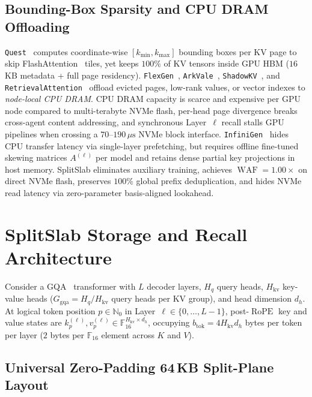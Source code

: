 \documentclass[final,5p,times,twocolumn]{elsarticle}
\theoremstyle{definition}
\theoremstyle{remark}
\newcommand{\SplitSlab}{\textup{\textsc{SplitSlab}}}
\newcommand{\RoPE}{\operatorname{RoPE}}
\newcommand{\WAF}{\operatorname{WAF}}
\def\SplitSlab{SplitSlab}%
\begin{document}
\subsection{Bounding-Box Sparsity and CPU DRAM Offloading}
\texttt{Quest}~\cite{tang2024quest} computes coordinate-wise $[k_{\min}, k_{\max}]$ bounding boxes per KV page to skip FlashAttention~\cite{dao2022flashattention} tiles, yet keeps $100\%$ of KV tensors inside GPU HBM ($16$\,KB metadata + full page residency). \texttt{FlexGen}~\cite{sheng2023flexgen}, \texttt{ArkVale}~\cite{chen2024arkvale}, \texttt{ShadowKV}~\cite{sun2025shadowkv}, and \texttt{RetrievalAttention}~\cite{liu2024retrievalattention} offload evicted pages, low-rank values, or vector indexes to \emph{node-local CPU DRAM}. CPU DRAM capacity is scarce and expensive per GPU node compared to multi-terabyte NVMe flash, per-head page divergence breaks cross-agent content addressing, and synchronous Layer~$\ell$ recall stalls GPU pipelines when crossing a $70$--$190\,\mu\mathrm{s}$ NVMe block interface. \texttt{InfiniGen}~\cite{lee2024infinigen} hides CPU transfer latency via single-layer prefetching, but requires offline fine-tuned skewing matrices $A^{(\ell)}$ per model and retains dense partial key projections in host memory. \SplitSlab{} eliminates auxiliary training, achieves $\WAF = 1.00\times$ on direct NVMe flash, preserves $100\%$ global prefix deduplication, and hides NVMe read latency via zero-parameter basis-aligned lookahead.

\section{SplitSlab Storage and Recall Architecture}\label{sec:arch}

Consider a GQA~\cite{ainslie2023gqa} transformer with $L$ decoder layers, $H_q$ query heads, $H_{\mathrm{kv}}$ key-value heads ($G_{\mathrm{gqa}} = H_q / H_{\mathrm{kv}}$ query heads per KV group), and head dimension $d_h$. At logical token position $p \in \mathbb{N}_0$ in Layer~$\ell \in \{0,\dots,L-1\}$, post-$\RoPE$ key and value states are $k_p^{(\ell)}, v_p^{(\ell)} \in \mathbb{F}_{16}^{H_{\mathrm{kv}} \times d_h}$, occupying $b_{\mathrm{tok}} = 4 H_{\mathrm{kv}} d_h$ bytes per token per layer ($2$ bytes per $\mathbb{F}_{16}$ element across $K$ and $V$).

\subsection{Universal Zero-Padding 64\,KB Split-Plane Layout}\label{subsec:layout}
\end{document}
